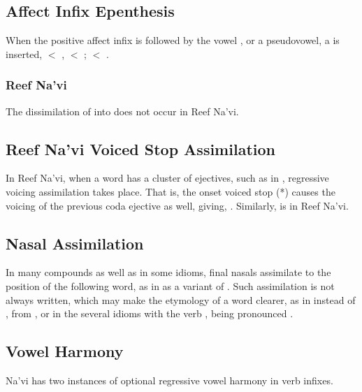 \subsection{Affect Infix Epenthesis} When the positive affect infix
 is followed by the vowel ,  or a pseudovowel, a
 is inserted,  $<$ ,  $<$
;  $<$ .
\label{l-and-s:eiy-epenth}

\subsubsection{Reef Na'vi} 
The dissimilation of  into  does not occur in Reef
Na'vi.


\subsection{Reef Na'vi Voiced Stop Assimilation} 
In Reef Na'vi, when a word has a cluster of ejectives, such as
in  , regressive voicing assimilation takes place.
That is, the onset voiced stop (*) causes the voicing of the
previous coda ejective as well, giving, .
Similarly,   is  in Reef Na'vi.

\subsection{Nasal Assimilation} In many compounds as well as in some
idioms, final nasals assimilate to the position of the following
word, as in  as a variant of .  Such assimilation is
not always written, which may make the etymology of a word clearer, as
in  instead of , from , or in the several
idioms with the verb  ,  being pronounced
.  \label{l-and-s:nasalassim}

\subsection{Vowel Harmony} Na'vi has two instances of optional
regressive vowel harmony in verb infixes.

